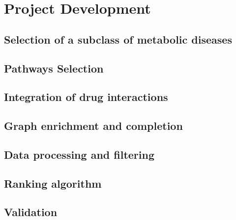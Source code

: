 \chapter{Project Development}\label{chap:project}


\section{Selection of a subclass of metabolic diseases}
\section{Pathways Selection}
\section{Integration of drug interactions}
\section{Graph enrichment and completion}
\section{Data processing and filtering}
\section{Ranking algorithm}
\section{Validation}

